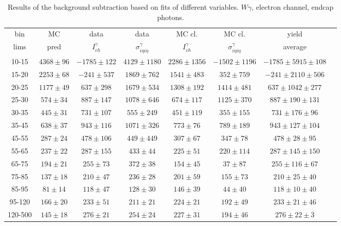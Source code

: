 \begin{table}[h]
  \tiny
  \begin{center}
  \caption{Results of the background subtraction based on fits of different variables. $W\gamma$, electron channel, endcap photons.}
  \begin{tabular}{|c|c|c|c|c|c|c|c|}
    bin &  MC   & data  & data  & MC cl. & MC cl. & yield\\ 
    lims & pred & $I_{ch}^{\gamma}$ & $\sigma_{i\eta i\eta}^\gamma$  & $I_{ch}^{\gamma}$  & $\sigma_{i\eta i\eta}^\gamma$   & average \\ \hline
     10-15 & $4368\pm96$ & $-1785\pm122$ & $4129\pm1180$ & $2286\pm1356$ & $-1502\pm1196$ &$-1785\pm5915\pm108$  \\ \hline
    15-20 & $2253\pm68$ & $-241\pm537$ & $1869\pm762$ & $1541\pm483$ & $352\pm759$ &$-241\pm2110\pm506$  \\ \hline
    20-25 & $1177\pm49$ & $637\pm298$ & $1679\pm534$ & $1308\pm192$ & $1414\pm481$ &$637\pm1042\pm277$  \\ \hline
    25-30 & $574\pm34$ & $887\pm147$ & $1078\pm646$ & $674\pm117$ & $1125\pm370$ &$887\pm190\pm131$  \\ \hline
    30-35 & $445\pm31$ & $731\pm107$ & $555\pm249$ & $451\pm119$ & $355\pm155$ &$731\pm176\pm96$  \\ \hline
    35-45 & $638\pm37$ & $943\pm116$ & $1071\pm326$ & $773\pm76$ & $789\pm189$ &$943\pm127\pm104$  \\ \hline
    45-55 & $287\pm24$ & $478\pm106$ & $449\pm449$ & $307\pm67$ & $347\pm78$ &$478\pm28\pm95$  \\ \hline
    55-65 & $237\pm22$ & $287\pm155$ & $433\pm44$ & $225\pm51$ & $220\pm114$ &$287\pm145\pm150$  \\ \hline
    65-75 & $194\pm21$ & $255\pm73$ & $372\pm38$ & $154\pm45$ & $37\pm87$ &$255\pm116\pm67$  \\ \hline
    75-85 & $137\pm18$ & $210\pm47$ & $236\pm28$ & $201\pm59$ & $155\pm73$ &$210\pm25\pm40$  \\ \hline
    85-95 & $81\pm14$ & $118\pm47$ & $128\pm30$ & $146\pm39$ & $44\pm40$ &$118\pm10\pm40$  \\ \hline
    95-120 & $166\pm20$ & $233\pm51$ & $211\pm21$ & $224\pm21$ & $192\pm49$ &$233\pm21\pm46$  \\ \hline
    120-500 & $145\pm18$ & $276\pm21$ & $254\pm24$ & $227\pm31$ & $194\pm46$ &$276\pm22\pm3$  \\ \hline
  \end{tabular}
  \label{tab:diff_ways_to_fit_phoEt_ENDCAP_electron}
  \end{center}
\end{table}


